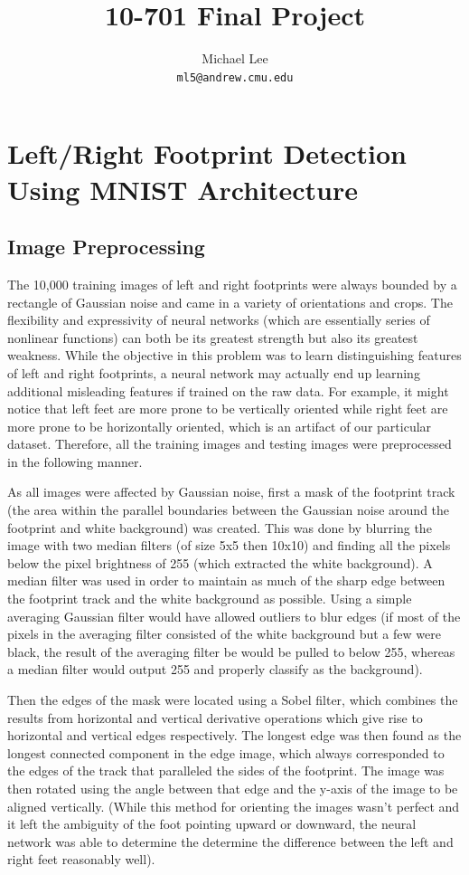 \documentclass{article}
\title{10-701 Final Project}
\author{
  Michael Lee \\
  \texttt{ml5@andrew.cmu.edu} \\
}
\begin{document}

\maketitle

\section{Left/Right Footprint Detection Using MNIST Architecture}

\subsection{Image Preprocessing}
The 10,000 training images of left and right footprints were always bounded by a rectangle of Gaussian noise and came in a variety of orientations and crops. The flexibility and expressivity of neural networks (which are essentially series of nonlinear functions) can both be its greatest strength but also its greatest weakness. While the objective in this problem was to learn distinguishing features of left and right footprints, a neural network may actually end up learning additional misleading features if trained on the raw data. For example, it might notice that left feet are more prone to be vertically oriented while right feet are more prone to be horizontally oriented, which is an artifact of our particular dataset. Therefore, all the training images and testing images were preprocessed in the following manner.

As all images were affected by Gaussian noise, first a mask of the footprint track (the area within the parallel boundaries between the Gaussian noise around the footprint and white background) was created. This was done by blurring the image with two median filters (of size 5x5 then 10x10) and finding all the pixels below the pixel brightness of 255 (which extracted the white background). A median filter was used in order to maintain as much of the sharp edge between the footprint track and the white background as possible. Using a simple averaging Gaussian filter would have allowed outliers to blur edges (if most of the pixels in the averaging filter consisted of the white background but a few were black, the result of the averaging filter be would be pulled to below 255, whereas a median filter would output 255 and properly classify as the background).

Then the edges of the mask were located using a Sobel filter, which combines the results from horizontal and vertical derivative operations which give rise to horizontal and vertical edges respectively. The longest edge was then found as the longest connected component in the edge image, which always corresponded to the edges of the track that paralleled the sides of the footprint. The image was then rotated using the angle between that edge and the y-axis of the image to be aligned vertically. (While this method for orienting the images wasn't perfect and it left the ambiguity of the foot pointing upward or downward, the neural network was able to determine the determine the difference between the left and right feet reasonably well).
\end{document}
